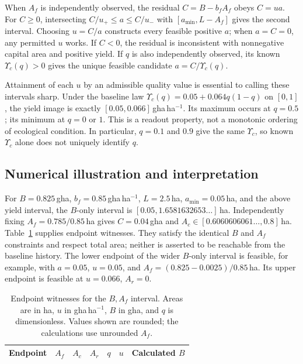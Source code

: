 \documentclass[11pt,a4paper]{article}
\newcommand{\Ups}{\Upsilon_c}
\begin{document}
When $A_f$ is independently observed, the residual $C=B-b_fA_f$ obeys $C=ua$. For $C\ge0$, intersecting $C/u_+\le a\le C/u_-$ with $[a_{\min},L-A_f]$ gives the second interval. Choosing $u=C/a$ constructs every feasible positive $a$; when $a=C=0$, any permitted $u$ works. If $C<0$, the residual is inconsistent with nonnegative capital area and positive yield. If $q$ is also independently observed, its known $\Ups(q)>0$ gives the unique feasible candidate $a=C/\Ups(q)$.

Attainment of each $u$ by an admissible quality value is essential to calling these intervals sharp. Under the baseline law $\Ups(q)=0.05+0.064q(1-q)$ on $[0,1]$, the yield image is exactly $[0.05,0.066]$\,gha\,ha$^{-1}$. Its maximum occurs at $q=0.5$; its minimum at $q=0$ or $1$. This is a readout property, not a monotonic ordering of ecological condition. In particular, $q=0.1$ and $0.9$ give the same $\Ups$, so known $\Ups$ alone does not uniquely identify $q$.

\subsection{Numerical illustration and interpretation}

For $B=0.825$\,gha, $b_f=0.85$\,gha\,ha$^{-1}$, $L=2.5$\,ha, $a_{\min}=0.05$\,ha, and the above yield interval, the $B$-only interval is $[0.05,1.6581632653\ldots]$\,ha. Independently fixing $A_f=0.785/0.85$\,ha gives $C=0.04$\,gha and $A_c\in[0.6060606061\ldots,0.8]$\,ha. Table~\ref{tab:si_c13witness} supplies endpoint witnesses. They satisfy the identical $B$ and $A_f$ constraints and respect total area; neither is asserted to be reachable from the baseline history. The lower endpoint of the wider $B$-only interval is feasible, for example, with $a=0.05$, $u=0.05$, and $A_f=(0.825-0.0025)/0.85$\,ha. Its upper endpoint is feasible at $u=0.066$, $A_r=0$.

\begin{table}[htbp]
\centering\small
\caption{Endpoint witnesses for the $B,A_f$ interval. Areas are in ha, $u$ in gha\,ha$^{-1}$, $B$ in gha, and $q$ is dimensionless. Values shown are rounded; the calculations use unrounded $A_f$.}
\label{tab:si_c13witness}
\begin{tabular}{lrrrrrr}
\toprule
Endpoint & $A_f$ & $A_c$ & $A_r$ & $q$ & $u$ & Calculated $B$ \\
\midrule

\end{tabular}
\end{table}
\end{document}
